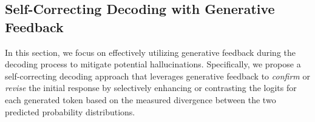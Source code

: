 




\subsection{Self-Correcting Decoding with Generative Feedback}
\label{sec:token}
In this section, we focus on effectively utilizing generative feedback during the decoding process to mitigate potential hallucinations. Specifically, we propose a self-correcting decoding approach that leverages generative feedback to \textit{confirm} or \textit{revise} the initial response by selectively enhancing or contrasting the logits for each generated token based on the measured divergence between the two predicted probability distributions.



